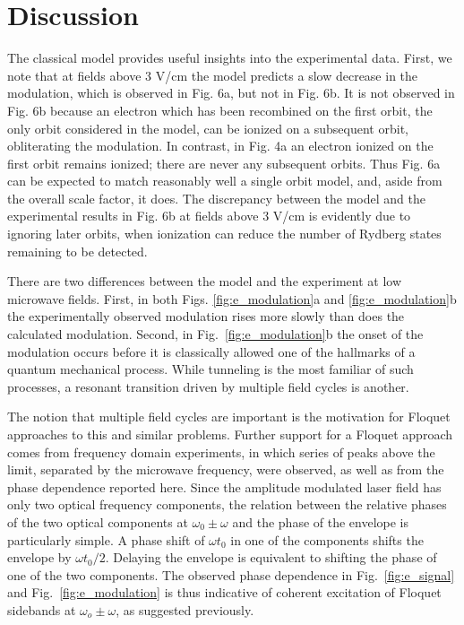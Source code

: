 \documentclass[pra, reprint]{revtex4-1}
\begin{document}
\section{Discussion}
\label{sec:discussion}
The classical model provides useful insights into the experimental data. First, we note that at fields above 3 V/cm the model predicts a slow decrease in the modulation, which is observed in Fig. 6a, but not in Fig. 6b. It is not observed in Fig. 6b because an electron which has been recombined on the first orbit, the only orbit considered in the model, can be ionized on a subsequent orbit, obliterating the modulation. In contrast, in Fig. 4a an electron ionized on the first orbit remains ionized; there are never any subsequent orbits. Thus Fig. 6a can be expected to match reasonably well a single orbit model, and, aside from the overall scale factor, it does. The discrepancy between the model and the experimental results in Fig. 6b at fields above 3 V/cm is evidently due to ignoring later orbits, when ionization can reduce the number of Rydberg states remaining to be detected.

There are two differences between the model and the experiment at low microwave fields. First, in both Figs. \ref{fig:e_modulation}a and \ref{fig:e_modulation}b the experimentally observed modulation rises more slowly than does the calculated modulation. Second, in Fig.~\ref{fig:e_modulation}b the onset of the modulation occurs before it is classically allowed one of the hallmarks of a quantum mechanical process. While tunneling is the most familiar of such processes, a resonant transition driven by multiple field cycles is another\cite{Stoneman_1988}.

The notion that multiple field cycles are important is the motivation for Floquet approaches to this and similar problems\cite{Tong_2010,Murakami_2013,Chu_1977,Giutsi_1987}. Further support for a Floquet approach comes from frequency domain experiments, in which series of peaks above the limit, separated by the microwave frequency, were observed\cite{Shuman_2008,Gurian_2010,Arakelyan_2014}, as well as from the phase dependence reported here. Since the amplitude modulated laser field has only two optical frequency components, the relation between the relative phases of the two optical components at $\omega_0 \pm \omega$ and the phase of the envelope is particularly  simple. A phase shift of $\omega t_0$ in one of the components shifts the envelope by $\omega t_0/2$. Delaying the envelope is equivalent to shifting the phase of one of the two components. The observed phase dependence in Fig.~\ref{fig:e_signal} and Fig.~\ref{fig:e_modulation} is thus indicative of coherent excitation of Floquet sidebands at $\omega_o\pm\omega$, as suggested previously\cite{Tong_2010}.
\end{document}
